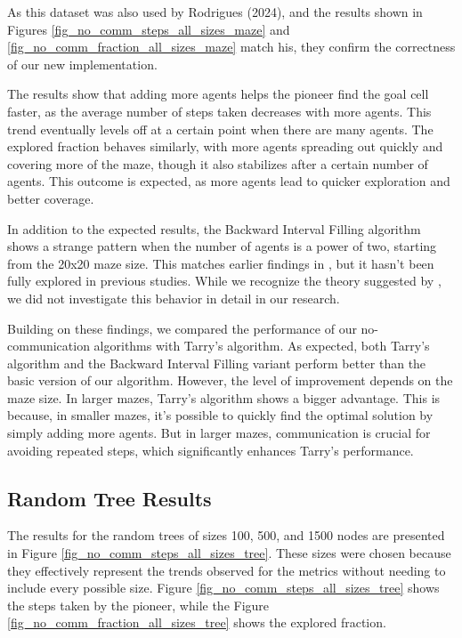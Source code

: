 As this dataset was also used by Rodrigues (2024), and the results shown in Figures \ref{fig_no_comm_steps_all_sizes_maze} and \ref{fig_no_comm_fraction_all_sizes_maze} match his, they confirm the correctness of our new implementation.

The results show that adding more agents helps the pioneer find the goal cell faster, as the average number of steps taken decreases with more agents. This trend eventually levels off at a certain point when there are many agents. The explored fraction behaves similarly, with more agents spreading out quickly and covering more of the maze, though it also stabilizes after a certain number of agents. This outcome is expected, as more agents lead to quicker exploration and better coverage.

In addition to the expected results, the Backward Interval Filling algorithm shows a strange pattern when the number of agents is a power of two, starting from the 20x20 maze size. This matches earlier findings in \cite{Arthur2023}, but it hasn't been fully explored in previous studies. While we recognize the theory suggested by , we did not investigate this behavior in detail in our research.

Building on these findings, we compared the performance of our no-communication algorithms with Tarry's algorithm. As expected, both Tarry's algorithm and the Backward Interval Filling variant perform better than the basic version of our algorithm. However, the level of improvement depends on the maze size. In larger mazes, Tarry's algorithm shows a bigger advantage. This is because, in smaller mazes, it's possible to quickly find the optimal solution by simply adding more agents. But in larger mazes, communication is crucial for avoiding repeated steps, which significantly enhances Tarry's performance.

\subsection{Random Tree Results} 
\label{subsection_no_comm_random_tree_results}

The results for the random trees of sizes 100, 500, and 1500 nodes are presented in Figure \ref{fig_no_comm_steps_all_sizes_tree}. These sizes were chosen because they effectively represent the trends observed for the metrics without needing to include every possible size. Figure \ref{fig_no_comm_steps_all_sizes_tree} shows the steps taken by the pioneer, while the Figure \ref{fig_no_comm_fraction_all_sizes_tree} shows the explored fraction.

